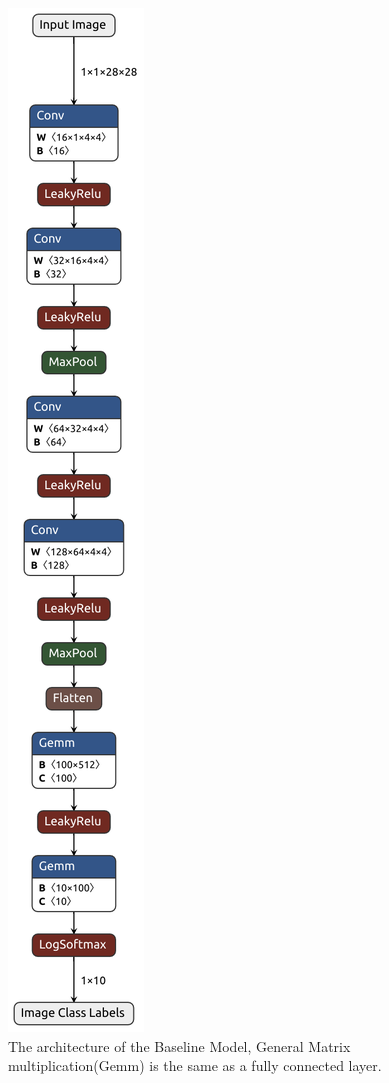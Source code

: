\begin{figure}
    \includegraphics[width=0.6\linewidth]{figures/CNN_Architetcure.png}
    \caption{The architecture of the Baseline Model, General Matrix multiplication(Gemm) is the same as a fully connected layer.}
    \label{fig:architecture}
    \vspace{-60pt} 
\end{figure}

